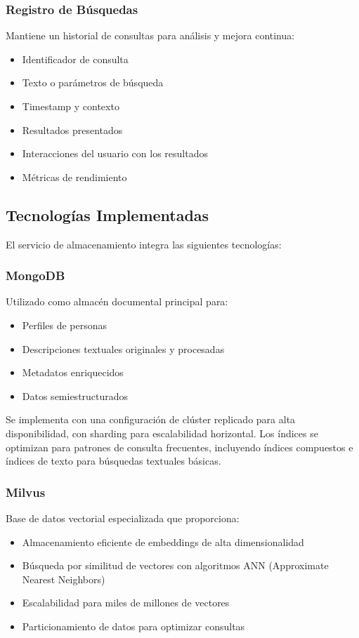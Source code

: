 \documentclass[12pt,a4paper]{article}
\begin{document}
\subsubsection{Registro de Búsquedas}
Mantiene un historial de consultas para análisis y mejora continua:

\begin{itemize}
    \item Identificador de consulta
    \item Texto o parámetros de búsqueda
    \item Timestamp y contexto
    \item Resultados presentados
    \item Interacciones del usuario con los resultados
    \item Métricas de rendimiento
\end{itemize}

\subsection{Tecnologías Implementadas}
\label{subsec:ds-tecnologias}

El servicio de almacenamiento integra las siguientes tecnologías:

\subsubsection{MongoDB}
Utilizado como almacén documental principal para:
\begin{itemize}
    \item Perfiles de personas
    \item Descripciones textuales originales y procesadas
    \item Metadatos enriquecidos
    \item Datos semiestructurados
\end{itemize}

Se implementa con una configuración de clúster replicado para alta disponibilidad, con sharding para escalabilidad horizontal. Los índices se optimizan para patrones de consulta frecuentes, incluyendo índices compuestos e índices de texto para búsquedas textuales básicas.

\subsubsection{Milvus}
Base de datos vectorial especializada que proporciona:
\begin{itemize}
    \item Almacenamiento eficiente de embeddings de alta dimensionalidad
    \item Búsqueda por similitud de vectores con algoritmos ANN (Approximate Nearest Neighbors)
    \item Escalabilidad para miles de millones de vectores
    \item Particionamiento de datos para optimizar consultas
\end{itemize}
\end{document}
